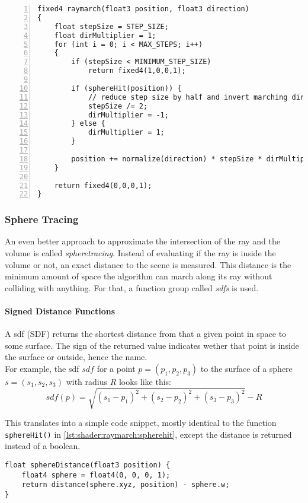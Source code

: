 \begin{lstlisting}[language=HLSL, numbers=left, caption=Traditional ray march function with converging surface distance approximation.,captionpos=b, label=lst:shader:raymarch:traditional]
fixed4 raymarch(float3 position, float3 direction)
{
    float stepSize = STEP_SIZE;
    float dirMultiplier = 1;
    for (int i = 0; i < MAX_STEPS; i++)
    {
        if (stepSize < MINIMUM_STEP_SIZE)
            return fixed4(1,0,0,1);

        if (sphereHit(position)) {
            // reduce step size by half and invert marching direction.
            stepSize /= 2;
            dirMultiplier = -1;
        } else {
            dirMultiplier = 1;
        }
        
        position += normalize(direction) * stepSize * dirMultiplier;
    }
    
    return fixed4(0,0,0,1);
}
\end{lstlisting}

\pagebreak
\subsubsection{Sphere Tracing}
An even better approach to approximate the intersection of the ray and the volume is called \textit{\gls{spheretracing}}. 
Instead of evaluating if the ray is inside the volume or not, an exact distance to the scene is measured. This distance is the minimum amount of space the algorithm can march along its ray without colliding with anything.
For that, a function group called \textit{\gls{sdf}s} is used.

\paragraph{Signed Distance Functions}
A \gls{sdf} (SDF) returns the shortest distance from that a given point in space to some surface.
The sign of the returned value indicates wether that point is inside the surface or outside, hence the name.
\\
For example, the \gls{sdf} $sdf$ for a point $p=(p_1, p_2, p_3)$ to the surface of a sphere $s=(s_1, s_2, s_3)$ with radius $R$ looks like this:
$$ sdf(p) = \sqrt{(s_1 - p_1)^2 + (s_2 - p_2)^2 + (s_3 - p_3)^2} - R $$

\noindent
This translates into a simple code snippet, mostly identical to the function \lstinline[language=HLSL]{sphereHit()} in \autoref{lst:shader:raymarch:spherehit}, except the distance is returned instead of a boolean.
\begin{lstlisting}[language=HLSL, caption=Implementation of a signed distance function for a sphere., label=lst:shader:raymarch:spheredistance]
float sphereDistance(float3 position) {
    float4 sphere = float4(0, 0, 0, 1);
    return distance(sphere.xyz, position) - sphere.w;
}
\end{lstlisting}


